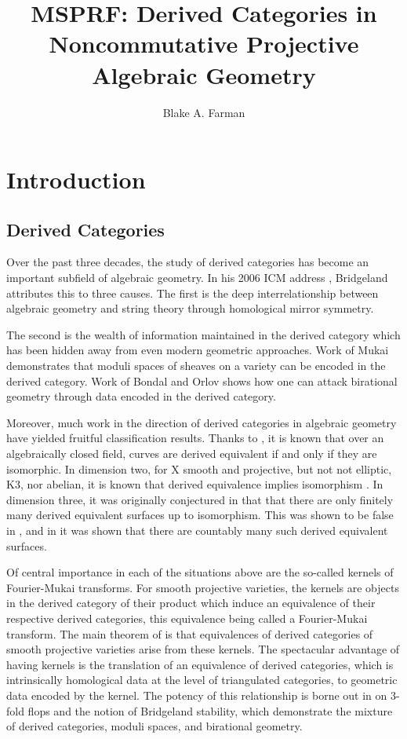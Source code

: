 \documentclass[11pt]{article}
\title{MSPRF: Derived Categories in Noncommutative Projective Algebraic Geometry}
\author{Blake A. Farman}
\date{}
\begin{document}
\maketitle

\section{Introduction}
\subsection{Derived Categories}
Over the past three decades, the study of derived categories has become an important subfield of algebraic geometry.
In his 2006 ICM address \cite{Bridgeland06}, Bridgeland attributes this to three causes.
The first is the deep interrelationship between algebraic geometry and string theory through homological mirror symmetry.

The second is the wealth of information maintained in the derived category which has been hidden away from even modern geometric approaches.
Work of Mukai \cite{Mukai81,Mukai87} demonstrates that moduli spaces of sheaves on a variety can be encoded in the derived category.
Work of Bondal and Orlov \cite{Bondal-Orlov} shows how one can attack birational geometry through data encoded in the derived category.

Moreover, much work in the direction of derived categories in algebraic geometry have yielded fruitful classification results.
Thanks to \cite{Orlov1997}, it is known that over an algebraically closed field, curves are derived equivalent if and only if they are isomorphic.
In dimension two, for X smooth and projective, but not not elliptic, K3, nor abelian, it is known that derived equivalence implies isomorphism \cite[Prop. 12.1]{HuyFMT}.
In dimension three, it was originally conjectured in \cite{kawamata2002} that that there are only finitely many derived equivalent surfaces up to isomorphism.
This was shown to be false in \cite{lesieutre2014}, and in \cite{AnToe} it was shown that there are countably many such derived equivalent surfaces.

Of central importance in each of the situations above are the so-called kernels of Fourier-Mukai transforms.
For smooth projective varieties, the kernels are objects in the derived category of their product which induce an equivalence of their respective derived categories, this equivalence being called a Fourier-Mukai transform.
The main theorem of \cite{Orlov1997} is that equivalences of derived categories of smooth projective varieties arise from these kernels.
The spectacular advantage of having kernels is the translation of an equivalence of derived categories, which is intrinsically homological data at the level of triangulated categories, to geometric data encoded by the kernel.
The potency of this relationship is borne out in \cite{Bridgeland02} on 3-fold flops and the notion of Bridgeland stability, which demonstrate the mixture of derived categories, moduli spaces, and birational geometry.
\end{document}
